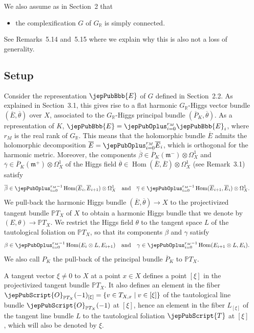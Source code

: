 We also assume as in Section~2 that
\begin{itemize}\item the complexification $G$ of $G_{\mathbb R}$ is simply connected.\end{itemize}
See Remarks~5.14 and~5.15 where we explain why this is also not a loss of generality.
\subsection{Setup}
Consider the representation $\jepPubBbb{E}$ of $G$ defined in Section~2.2. As explained in Section~3.1, this gives rise to a flat harmonic $G_{\mathbb R}$-Higgs vector bundle $(\overline E,\overline\theta)$ over $X$, associated to the $G_{\mathbb R}$-Higgs principal bundle $(\overline P_K,\overline\theta)$. As a representation of $K$, $\jepPubBbb{E}=\jepPubOplus_{i=0}^{r_M}\jepPubBbb{E}_i$, where $r_M$ is the real rank of $G_{\mathbb R}$. This means that the holomorphic bundle $\overline E$ admits the holomorphic decomposition $\overline E=\jepPubOplus_{i=0}^{r_M}\overline E_i$, which is orthogonal for the harmonic metric. Moreover, the components $\overline\beta\in\overline P_K(\mathfrak m^-)\otimes\Omega_X^1$ and $\overline\gamma\in\overline P_K(\mathfrak m^+)\otimes\Omega_X^1$ of the Higgs field $\overline\theta\in\operatorname{Hom}(\overline E,\overline E)\otimes\Omega_X^1$ (see Remark~3.1) satisfy
\[
\overline\beta\in\jepPubOplus_{i=0}^{r_M-1}\operatorname{Hom}(\overline E_i,\overline E_{i+1})\otimes\Omega_X^1\quad\text{and}\quad\overline\gamma\in\jepPubOplus_{i=0}^{r_M-1}\operatorname{Hom}(\overline E_{i+1},\overline E_i)\otimes\Omega_X^1.
\]
We pull-back the harmonic Higgs bundle $(\overline E,\overline\theta)\to X$ to the projectivized tangent bundle $\mathbb PT_X$ of $X$ to obtain a harmonic Higgs bundle that we denote by $(E,\theta)\to\mathbb PT_X$. We restrict the Higgs field $\theta$ to the tangent space $L$ of the tautological foliation on $\mathbb PT_X$, so that its components $\beta$ and $\gamma$ satisfy
\[
\beta\in\jepPubOplus_{i=0}^{r_M-1}\operatorname{Hom}(E_i\otimes L,E_{i+1})\quad\text{and}\quad\gamma\in\jepPubOplus_{i=0}^{r_M-1}\operatorname{Hom}(E_{i+1}\otimes L,E_i).
\]
We also call $P_K$ the pull-back of the principal bundle $\overline P_K$ to $\mathbb PT_X$.
\begin{notation}
A tangent vector $\xi\neq0$ to $X$ at a point $x\in X$ defines a point $[\xi]$ in the projectivized tangent bundle $\mathbb PT_X$. It also defines an element in the fiber $\jepPubScript{O}_{\mathbb PT_X}(-1)_{[\xi]}=\{v\in T_{X,x}\mid v\in[\xi]\}$ of the tautological line bundle $\jepPubScript{O}_{\mathbb PT_X}(-1)$ at $[\xi]$, hence an element in the fiber $L_{[\xi]}$ of the tangent line bundle $L$ to the tautological foliation $\jepPubScript{T}$ at $[\xi]$, which will also be denoted by $\xi$.
\end{notation}
